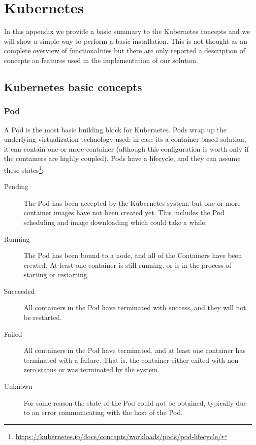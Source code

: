 \chapter{Kubernetes}
\label{kubernetes}

\newcommand{\gluster}{GlusterFS}

In this appendix we provide a basic summary to the Kubernetes concepts and
we will show a simple way to perform a basic installation. This is not thought 
as an complete overview of functionalities but there are only reported a 
description of concepts an features used in the implementation of our solution. 

\section{Kubernetes basic concepts}
\label{kubernetes-basic-concepts}

\subsection{Pod}
\label{pod}

A Pod is the most basic building block for Kubernetes. Pods wrap up the
underlying virtualization technology used: in case its a container based
solution, it can contain one or more container (although this configuration is
worth only if the containers are highly coupled). Pods have a lifecycle, and
they can assume these states\footnote{
  \url{https://kubernetes.io/docs/concepts/workloads/pods/pod-lifecycle/}}:

\begin{description}
\item[Pending] The Pod has been accepted by the Kubernetes system, but
  one or more container images have not been created yet. This includes the Pod
  scheduling and image downloading which could take a while.
\item[Running] The Pod has been bound to a node, and all of the
  Containers have been created. At least one container is still running, or is
  in the process of starting or restarting.
\item[Succeeded] All containers in the Pod have terminated with
  success, and they will not be restarted.
\item[Failed] All containers in the Pod have terminated, and at least
  one container has terminated with a failure. That is, the container either
  exited with non-zero status or was terminated by the system.
\item[Unknown] For some reason the state of the Pod could not be
  obtained, typically due to an error communicating with the host of the Pod.
\end{description}

